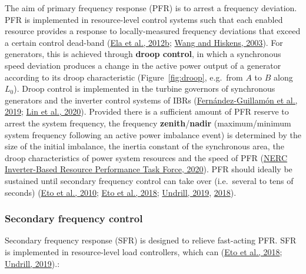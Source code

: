 \documentclass[12pt,a4paper,]{report}
\begin{document}
The aim of primary frequency response (PFR) is to arrest a frequency
deviation. PFR is implemented in resource-level control systems such
that each enabled resource provides a response to locally-measured
frequency deviations that exceed a certain control dead-band
(\protect\hyperlink{ref-elaAlternativeApproachesIncentivizing2012}{Ela
et al., 2012b};
\protect\hyperlink{ref-wangReviewAGCImplementation2003}{Wang and
Hiskens, 2003}). For generators, this is achieved through \textbf{droop
control}, in which a synchronous speed deviation produces a change in
the active power output of a generator according to its droop
characteristic (Figure~\ref{fig:droop}, e.g.~from \(A\) to \(B\) along
\(L_0\)). Droop control is implemented in the turbine governors of
synchronous generators and the inverter control systems of IBRs
(\protect\hyperlink{ref-fernandez-guillamonPowerSystemsHigh2019}{Fernández-Guillamón
et al., 2019};
\protect\hyperlink{ref-linResearchRoadmapGridForming2020}{Lin et al.,
2020}). Provided there is a sufficient amount of PFR reserve to arrest
the system frequency, the frequency \textbf{zenith}/\textbf{nadir}
(maximum/minimum system frequency following an active power imbalance
event) is determined by the size of the initial imbalance, the inertia
constant of the synchronous area, the droop characteristics of power
system resources and the speed of PFR
(\protect\hyperlink{ref-nercinverter-basedresourceperformancetaskforceFastFrequencyResponse2020}{NERC
Inverter-Based Resource Performance Task Force, 2020}). PFR should
ideally be sustained until secondary frequency control can take over
(i.e.~several to tens of seconds)
(\protect\hyperlink{ref-etoUseFrequencyResponse2010}{Eto et al., 2010};
\protect\hyperlink{ref-etoFrequencyControlRequirements2018}{Eto et al.,
2018}; \protect\hyperlink{ref-undrillNotesFrequencyControl2019}{Undrill,
2019},
\protect\hyperlink{ref-undrillPrimaryFrequencyResponse2018}{2018}).

\hypertarget{secondary-frequency-control}{%
\subsubsection{Secondary frequency
control}\label{secondary-frequency-control}}

Secondary frequency response (SFR) is designed to relieve fast-acting
PFR. SFR is implemented in resource-level load controllers, which can
(\protect\hyperlink{ref-etoFrequencyControlRequirements2018}{Eto et al.,
2018}; \protect\hyperlink{ref-undrillNotesFrequencyControl2019}{Undrill,
2019}).:
\end{document}
